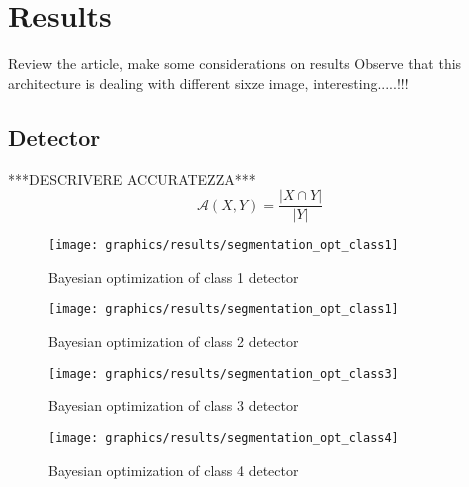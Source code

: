 \section{Results}\label{section:results}
    Review the article, make some considerations on results
    Observe that this architecture is dealing with different sixze image, interesting.....!!!

    \subsection{Detector}
        \par{
		    ***DESCRIVERE ACCURATEZZA***
		    \begin{equation*}
		    \mathcal{A}\left(X, Y\right) = \frac{\lvert X \cap Y \rvert}{\lvert Y \rvert}
		    \end{equation*}
		}
        \begin{figure}
    	\centering
    	\texttt{[image: graphics/results/segmentation\_opt\_class1]}
    	\caption{Bayesian optimization of class 1 detector}\label{fig:bayesopt-class1}
    \end{figure}
    \begin{figure}
    	\centering
    	\texttt{[image: graphics/results/segmentation\_opt\_class1]}
    	\caption{Bayesian optimization of class 2 detector}\label{fig:bayesopt-class2}
    \end{figure}
    \begin{figure}
    	\centering
    	\texttt{[image: graphics/results/segmentation\_opt\_class3]}
    	\caption{Bayesian optimization of class 3 detector}\label{fig:bayesopt-class3}
    \end{figure}
    \begin{figure}
    	\centering
    	\texttt{[image: graphics/results/segmentation\_opt\_class4]}
    	\caption{Bayesian optimization of class 4 detector}\label{fig:bayesopt-class4}
    \end{figure}

